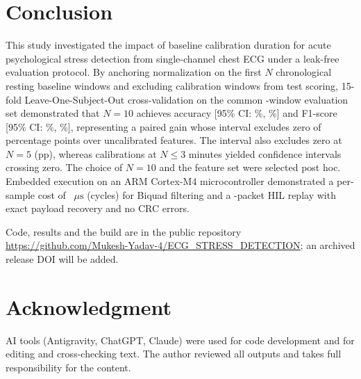 \documentclass[conference]{IEEEtran}
\begin{document}
\section{Conclusion}
This study investigated the impact of baseline calibration duration for acute psychological stress detection from single-channel chest ECG under a leak-free evaluation protocol. By anchoring normalization on the first $N$ chronological resting baseline windows and excluding calibration windows from test scoring, 15-fold Leave-One-Subject-Out cross-validation on the common \valEvalWindows-window evaluation set demonstrated that $N=10$ achieves \valNtenAccPct accuracy [95\% CI: \valNtenAccCILow\%, \valNtenAccCIHigh\%] and \valNtenFOnePct F1-score [95\% CI: \valNtenFOneCILow\%, \valNtenFOneCIHigh\%], representing a paired gain whose interval excludes zero of \valPairedGainNten percentage points over uncalibrated features. The interval also excludes zero at $N=5$ (\valPairedGainNfive pp), whereas calibrations at $N \le 3$ minutes yielded confidence intervals crossing zero. The choice of $N = 10$ and the feature set were selected post hoc. Embedded execution on an ARM Cortex-M4 microcontroller demonstrated a per-sample cost of \valBiquadMeanUs~$\mu\text{s}$ (\valBiquadMeanCycles cycles) for Biquad filtering and a \valHilPackets-packet HIL replay with exact payload recovery and no CRC errors.

Code, results and the build are in the public repository \url{https://github.com/Mukesh-Yadav-4/ECG_STRESS_DETECTION}; an archived release DOI will be added.

\section*{Acknowledgment}
AI tools (Antigravity, ChatGPT, Claude) were used for code development and for editing and cross-checking text. The author reviewed all outputs and takes full responsibility for the content.



\end{document}

